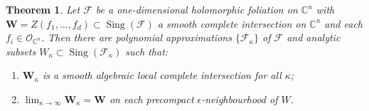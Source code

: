 \documentclass[10pt,twoside]{amsart}
\numberwithin{equation}{section}
\newtheorem{theorem}[proposition]{Theorem}
\theoremstyle{definition}
\theoremstyle{remark}
\DeclareMathOperator{\sing}{Sing}
\newcommand{\C}{\mathbb{C}}
\newcommand{\F}{\mathcal{F}}
\newcommand{\oo}{\mathcal{O}}
\newcommand{\W}{\mathbf{W}}
\begin{document}
\begin{theorem}\label{thm:polynomial-approximation}
Let $\F$ be a one-dimensional holomorphic foliation on $\C^n$ with
$\W=Z(f_1,\ldots,f_d)\subset\sing(\F)$ a smooth complete intersection on $\C^n$ and each $f_i\in \oo_{\C^n}$.
Then there are polynomial approximations $\{\F_\kappa\}$ of $\F$ and analytic subsets $W_\kappa\subset\sing(\F_\kappa)$ such that:
\begin{enumerate}
\item[(a)] $\W_{\kappa}$ is a smooth algebraic local complete intersection for all $\kappa$;
\item[(b)] $\displaystyle\lim_{\kappa\to \infty}\W_{\kappa}=\W$ on each precompact $\epsilon$-neighbourhood of $W$.
\end{enumerate}
\end{theorem}
\end{document}
